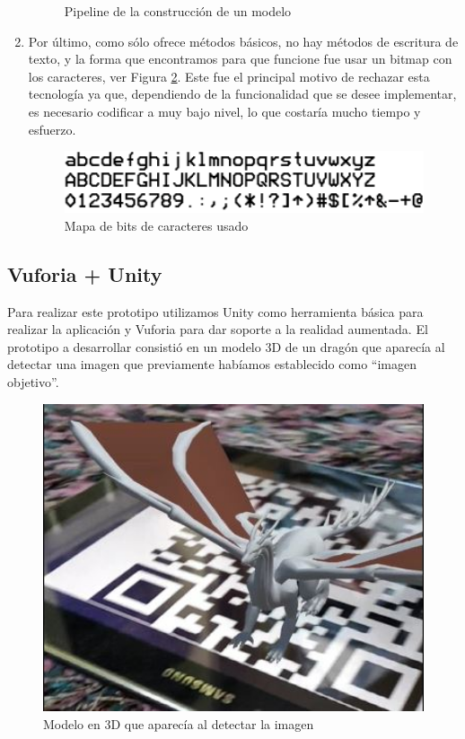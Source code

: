 \begin{enumerate}
\begin{figure}
        \caption{Pipeline de la construcción de un modelo\cite{pipelineopengl}}
        \label{fig:pipeline}
    \end{figure}
    \item Por último, como sólo ofrece métodos básicos, no hay métodos de escritura de texto, y la forma que 
    encontramos para que funcione fue usar un bitmap con los caracteres, ver Figura \ref{fig:mapaBits}. Este fue el principal 
    motivo de rechazar esta tecnología ya que, dependiendo de la funcionalidad que se desee implementar, es necesario codificar a muy bajo nivel, lo que costaría mucho tiempo y esfuerzo.
    \begin{figure}
        \centering
        \includegraphics[width=5in]{figures/bitmap-font.png}
        \caption{Mapa de bits de caracteres usado}
        \label{fig:mapaBits}
    \end{figure}
\end{enumerate}

\subsection{Vuforia + Unity} 
\label{makereference4.1.4}

    Para realizar este prototipo utilizamos Unity como herramienta básica para realizar la aplicación y Vuforia para dar soporte a la realidad aumentada.
    El prototipo a desarrollar consistió en un modelo 3D de un dragón que aparecía al detectar una imagen que previamente habíamos establecido como ``imagen objetivo''.

    \begin{figure}[H]
        \centering
        \includegraphics[width=5in]{figures/prototipoUnity.jpg}
        \caption{Modelo en 3D que aparecía al detectar la imagen}
    \end{figure}

